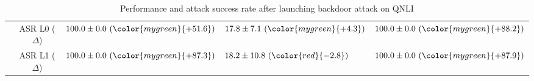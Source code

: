 \begin{table*}[!ht]
{\begin{tabular}{c | c | lll }
	& ASR L0 ($\Delta$)
	& $100.0 \pm 0.0 \ ({\color{mygreen}{+51.6}})$     %
	& $17.8 \pm 7.1  \ ({\color{mygreen}{+4.3}})$    %
	& $100.0 \pm 0.0  \ ({\color{mygreen}{+88.2}})$ \\ %
	
	& ASR L1 ($\Delta$)
	& $100.0 \pm 0.0 \ ({\color{mygreen}{+87.3}})$     %
	& $18.2 \pm 10.8  \ ({\color{red}{-2.8}})$    %
	& $100.0 \pm 0.0  \ ({\color{mygreen}{+87.9}})$ \\ %

        \bottomrule
        \end{tabular}
 }
 \caption{Performance and attack success rate after launching backdoor attack on QNLI}
 \label{tab:backdoor_perform_qnli}
\end{table*}

